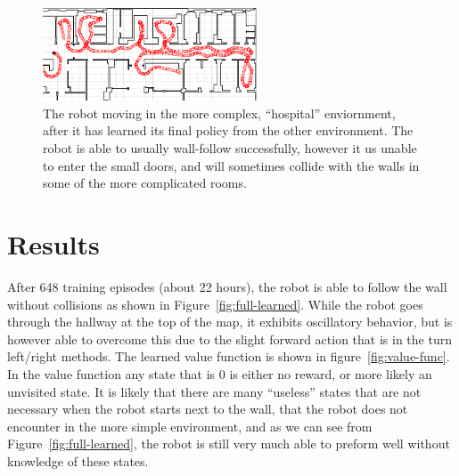 \documentclass[letterpaper, 10 pt, conference]{ieeeconf}  %
\begin{document}
\begin{figure}
\centering
\includegraphics[width=2.5in]{hospital.png}
\caption{The robot moving in the more complex, ``hospital'' enviornment, after it has learned its final policy from the other environment. 
The robot is able to usually wall-follow successfully, however it us unable to enter the small doors, and will sometimes collide with the walls in some of the more complicated rooms. }
\label{fig:hospital}
\end{figure}


\section{Results}
After 648 training episodes (about 22 hours), the robot is able to follow the wall without collisions as shown in Figure~\ref{fig:full-learned}. 
While the robot goes through the hallway at the top of the map, it exhibits oscillatory behavior, but is however able to overcome this due to the slight forward action that is in the turn left/right methods. 
The learned value function is shown in figure~\ref{fig:value-func}. 
In the value function any state that is 0 is either no reward, or more likely an unvisited state. 
It is likely that there are many ``useless'' states that are not necessary when the robot starts next to the wall, that the robot does not encounter in the more simple environment, and as we can see from Figure~\ref{fig:full-learned}, the robot is still very much able to preform well without knowledge of these states.


\end{document}
